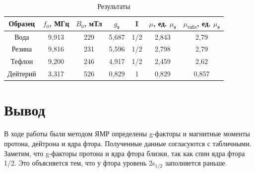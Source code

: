 \documentclass[a4paper,12pt]{article} %
\begin{document}
\begin{table}[h!]
\begin{tabular}{|c|c|c|c|c|c|c|}
\hline
Образец  & $f_0$, МГц & $B_0$, мТл & $g_{\text{я}}$ & I   & $\mu$, ед. $\mu_{\text{я}}$ & $\mu_{\text{табл}}$, ед. $\mu_{\text{я}}$ \\ \hline
Вода     & 9,913      & 229        & 5,687          & 1/2 & 2,843                       & 2,79                                      \\ \hline
Резина   & 9,816      & 231        & 5,596          & 1/2 & 2,798                       & 2,79                                      \\ \hline
Тефлон   & 9,200      & 246        & 4,917          & 1/2 & 2,459                       & 2,62                                      \\ \hline
Дейтерий & 3,317      & 526        & 0,829          & 1   & 0,829                       & 0,857                                     \\ \hline
\end{tabular}
\caption{Результаты}
\end{table}

\section{Вывод}

В ходе работы были методом ЯМР определены g-факторы и магнитные моменты протона, дейтрона и ядра фтора. Полученные данные согласуются с табличными. Заметим, что g-факторы протона и ядра фтора близки, так как спин ядра фтора 1/2. Это объясняется тем, что у фтора уровень 2s$_{1/2}$ заполняется раньше.
\end{document}

